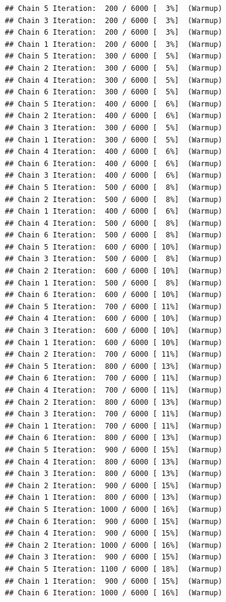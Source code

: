 \documentclass[
]{article}
\begin{document}
\begin{verbatim}
## Chain 5 Iteration:  200 / 6000 [  3%]  (Warmup) 
## Chain 3 Iteration:  200 / 6000 [  3%]  (Warmup) 
## Chain 6 Iteration:  200 / 6000 [  3%]  (Warmup) 
## Chain 1 Iteration:  200 / 6000 [  3%]  (Warmup) 
## Chain 5 Iteration:  300 / 6000 [  5%]  (Warmup) 
## Chain 2 Iteration:  300 / 6000 [  5%]  (Warmup) 
## Chain 4 Iteration:  300 / 6000 [  5%]  (Warmup) 
## Chain 6 Iteration:  300 / 6000 [  5%]  (Warmup) 
## Chain 5 Iteration:  400 / 6000 [  6%]  (Warmup) 
## Chain 2 Iteration:  400 / 6000 [  6%]  (Warmup) 
## Chain 3 Iteration:  300 / 6000 [  5%]  (Warmup) 
## Chain 1 Iteration:  300 / 6000 [  5%]  (Warmup) 
## Chain 4 Iteration:  400 / 6000 [  6%]  (Warmup) 
## Chain 6 Iteration:  400 / 6000 [  6%]  (Warmup) 
## Chain 3 Iteration:  400 / 6000 [  6%]  (Warmup) 
## Chain 5 Iteration:  500 / 6000 [  8%]  (Warmup) 
## Chain 2 Iteration:  500 / 6000 [  8%]  (Warmup) 
## Chain 1 Iteration:  400 / 6000 [  6%]  (Warmup) 
## Chain 4 Iteration:  500 / 6000 [  8%]  (Warmup) 
## Chain 6 Iteration:  500 / 6000 [  8%]  (Warmup) 
## Chain 5 Iteration:  600 / 6000 [ 10%]  (Warmup) 
## Chain 3 Iteration:  500 / 6000 [  8%]  (Warmup) 
## Chain 2 Iteration:  600 / 6000 [ 10%]  (Warmup) 
## Chain 1 Iteration:  500 / 6000 [  8%]  (Warmup) 
## Chain 6 Iteration:  600 / 6000 [ 10%]  (Warmup) 
## Chain 5 Iteration:  700 / 6000 [ 11%]  (Warmup) 
## Chain 4 Iteration:  600 / 6000 [ 10%]  (Warmup) 
## Chain 3 Iteration:  600 / 6000 [ 10%]  (Warmup) 
## Chain 1 Iteration:  600 / 6000 [ 10%]  (Warmup) 
## Chain 2 Iteration:  700 / 6000 [ 11%]  (Warmup) 
## Chain 5 Iteration:  800 / 6000 [ 13%]  (Warmup) 
## Chain 6 Iteration:  700 / 6000 [ 11%]  (Warmup) 
## Chain 4 Iteration:  700 / 6000 [ 11%]  (Warmup) 
## Chain 2 Iteration:  800 / 6000 [ 13%]  (Warmup) 
## Chain 3 Iteration:  700 / 6000 [ 11%]  (Warmup) 
## Chain 1 Iteration:  700 / 6000 [ 11%]  (Warmup) 
## Chain 6 Iteration:  800 / 6000 [ 13%]  (Warmup) 
## Chain 5 Iteration:  900 / 6000 [ 15%]  (Warmup) 
## Chain 4 Iteration:  800 / 6000 [ 13%]  (Warmup) 
## Chain 3 Iteration:  800 / 6000 [ 13%]  (Warmup) 
## Chain 2 Iteration:  900 / 6000 [ 15%]  (Warmup) 
## Chain 1 Iteration:  800 / 6000 [ 13%]  (Warmup) 
## Chain 5 Iteration: 1000 / 6000 [ 16%]  (Warmup) 
## Chain 6 Iteration:  900 / 6000 [ 15%]  (Warmup) 
## Chain 4 Iteration:  900 / 6000 [ 15%]  (Warmup) 
## Chain 2 Iteration: 1000 / 6000 [ 16%]  (Warmup) 
## Chain 3 Iteration:  900 / 6000 [ 15%]  (Warmup) 
## Chain 5 Iteration: 1100 / 6000 [ 18%]  (Warmup) 
## Chain 1 Iteration:  900 / 6000 [ 15%]  (Warmup) 
## Chain 6 Iteration: 1000 / 6000 [ 16%]  (Warmup) 

\end{verbatim}
\end{document}
